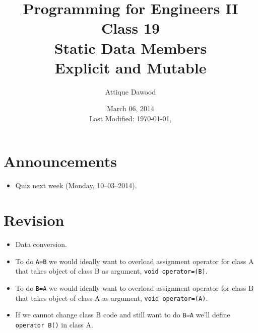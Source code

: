 \documentclass[12pt,a4paper]{article}
\title{\vspace{-2cm}Programming for Engineers II\\Class 19\\Static Data Members\\Explicit and Mutable}
\author{Attique Dawood}
\date{March 06, 2014\\[0.2cm] Last Modified: \today, \currenttime}
\begin{document}
\maketitle
\section{Announcements}
\begin{itemize}
\item Quiz next week (Monday, 10--03--2014).
\end{itemize}
\section{Revision}
\begin{itemize}
\item Data conversion.
\item To do \verb|A=B| we would ideally want to overload assignment operator for class A that takes object of class B as argument, \verb|void operator=(B)|.
\item To do \verb|B=A| we would ideally want to overload assignment operator for class B that takes object of class A as argument, \verb|void operator=(A)|.
\item If we cannot change class B code and still want to do \verb|B=A| we'll define \verb|operator B()| in class A.
\end{itemize}
\end{document}
